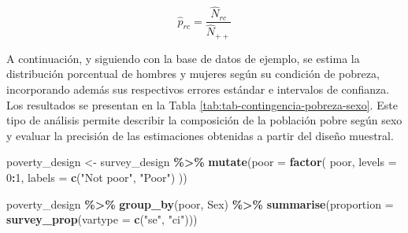 \documentclass[
  spanish,
  12pt,
]{book}
\newenvironment{Shaded}{\begin{snugshade}}{\end{snugshade}}
\newcommand{\AttributeTok}[1]{\textcolor[rgb]{0.13,0.29,0.53}{#1}}
\newcommand{\DecValTok}[1]{\textcolor[rgb]{0.00,0.00,0.81}{#1}}
\newcommand{\FunctionTok}[1]{\textcolor[rgb]{0.13,0.29,0.53}{\textbf{#1}}}
\newcommand{\NormalTok}[1]{#1}
\newcommand{\OtherTok}[1]{\textcolor[rgb]{0.56,0.35,0.01}{#1}}
\newcommand{\SpecialCharTok}[1]{\textcolor[rgb]{0.81,0.36,0.00}{\textbf{#1}}}
\newcommand{\StringTok}[1]{\textcolor[rgb]{0.31,0.60,0.02}{#1}}
\begin{document}
\[
\hat{p}_{rc}=\frac{\hat{N}_{rc}}{\hat{N}_{++}}
\]

A continuación, y siguiendo con la base de datos de ejemplo, se estima la distribución porcentual de hombres y mujeres según su condición de pobreza, incorporando además sus respectivos errores estándar e intervalos de confianza. Los resultados se presentan en la Tabla \ref{tab:tab-contingencia-pobreza-sexo}. Este tipo de análisis permite describir la composición de la población pobre según sexo y evaluar la precisión de las estimaciones obtenidas a partir del diseño muestral.

\begin{Shaded}
\begin{Highlighting}[]
\NormalTok{poverty\_design }\OtherTok{\textless{}{-}}\NormalTok{ survey\_design }\SpecialCharTok{\%\textgreater{}\%}
  \FunctionTok{mutate}\NormalTok{(}\AttributeTok{poor =} \FunctionTok{factor}\NormalTok{(}
\NormalTok{    poor,}
    \AttributeTok{levels =} \DecValTok{0}\SpecialCharTok{:}\DecValTok{1}\NormalTok{,}
    \AttributeTok{labels =} \FunctionTok{c}\NormalTok{(}\StringTok{"Not poor"}\NormalTok{, }\StringTok{"Poor"}\NormalTok{)}
\NormalTok{  ))}
\end{Highlighting}
\end{Shaded}

\begin{Shaded}
\begin{Highlighting}[]
\NormalTok{poverty\_design }\SpecialCharTok{\%\textgreater{}\%}
  \FunctionTok{group\_by}\NormalTok{(poor, Sex) }\SpecialCharTok{\%\textgreater{}\%}
  \FunctionTok{summarise}\NormalTok{(}\AttributeTok{proportion =} \FunctionTok{survey\_prop}\NormalTok{(}\AttributeTok{vartype =} \FunctionTok{c}\NormalTok{(}\StringTok{"se"}\NormalTok{, }\StringTok{"ci"}\NormalTok{)))}
\end{Highlighting}
\end{Shaded}
\end{document}
